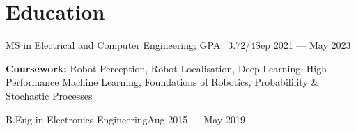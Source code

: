 \section{Education}
\resumeSubHeadingListStart{}

{MS in Electrical and Computer Engineering;  GPA:\ 3.72/4}{Sep 2021 --- May 2023}
{\item[]\small{\textbf{Coursework:} Robot Perception, Robot Localisation, Deep Learning, High Performance Machine Learning,
		Foundations of Robotics, Probabilility \& Stochastic Processes} \vspace{-4pt}}

{B.Eng in Electronics Engineering}{Aug 2015 --- May 2019}

\resumeSubHeadingListEnd{}{}{}